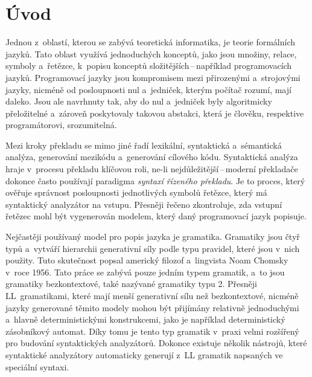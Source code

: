 
%

\listofdotazy
\listoftodos

\chapter{Úvod}\label{kap_uvod}
Jednou z~oblastí, kterou se zabývá teoretická informatika, je teorie formálních jazyků.
Tato oblast využívá jednoduchých konceptů, jako jsou množiny, relace, symboly a~řetězce, k~popisu konceptů složitějších\,--\,například programovacích jazyků.
Programovací jazyky jsou kompromisem mezi přirozenými a~strojovými jazyky, nicméně od posloupnosti nul a~jedniček, kterým počítač rozumí, mají daleko.
Jsou ale navrhnuty tak, aby do nul a~jedniček byly algoritmicky přeložitelné a~zároveň poskytovaly takovou abstakci, která je člověku, respektive programátorovi, srozumitelná.  

Mezi kroky překladu se mimo jiné řadí lexikální, syntaktická a~sémantická analýza, generování mezikódu a~generování cílového kódu.
Syntaktická analýza hraje v~procesu překladu klíčovou roli, ne-li nejdůležitější\,--\,moderní překladače dokonce často používají paradigma \emph{syntaxí řízeného překladu}.
Je to proces, který ověřuje správnost posloupnosti jednotlivých symbolů řetězce, který má syntaktický analyzátor na vstupu.
Přesněji řečeno zkontroluje, zda vstupní řetězec mohl být vygenerován modelem, který daný programovací jazyk popisuje.

Nejčastěji používaný model pro popis jazyka je gramatika.
Gramatiky jsou čtyř typů a~vytváří hierarchii generativní síly podle typu pravidel, které jsou v~nich použity.
Tuto skutečnost popsal americký filozof a~lingvista Noam Chomsky v~roce 1956.
Tato práce se zabývá pouze jedním typem gramatik, a~to jsou gramatiky bezkontextové, také nazývané gramatiky typu 2.
Přesněji LL~gramatikami, které mají menší generativní sílu než bezkontextové, nicméně jazyky generované těmito modely mohou být přijímány relativně jednoduchými a~hlavně deterministickými konstrukcemi, jako je například deterministický zásobníkový automat.
Díky tomu je tento typ gramatik v~praxi velmi rozšířený pro budování syntaktických analyzátorů.
Dokonce existuje několik nástrojů, které syntaktické analyzátory automaticky generují z~LL gramatik napsaných ve speciální syntaxi.

